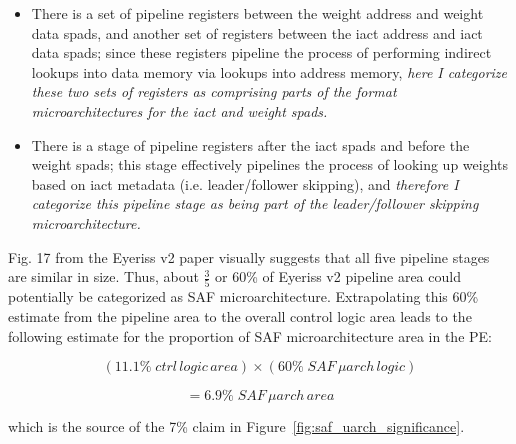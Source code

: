 \begin{itemize}
    \item There is a set of pipeline registers between the weight address and weight data spads, and another set of registers between the iact address and iact data spads; since these registers pipeline the process of performing indirect lookups into data memory via lookups into address memory, \textit{here I categorize these two sets of registers as comprising parts of the format microarchitectures for the iact and weight spads.}
    
    \item There is a stage of pipeline registers after the iact spads and before the weight spads; this stage effectively pipelines the process of looking up weights based on iact metadata (i.e. leader/follower skipping), and \textit{therefore I categorize this pipeline stage as being part of the leader/follower skipping microarchitecture.}
\end{itemize}

Fig. 17 from the Eyeriss v2 paper visually suggests that all five pipeline stages are similar in size. Thus, about $\frac{3}{5}$ or 60\% of Eyeriss v2 pipeline area could potentially be categorized as SAF microarchitecture. Extrapolating this 60\% estimate from the pipeline area to the overall control logic area leads to the following estimate for the proportion of SAF microarchitecture area in the PE:

\[(11.1\%\;ctrl\,logic\,area)\times(60\%\;SAF\,\mu arch\,logic)\]

\[ = 6.9\%\; SAF\,\mu arch\,area\]


which is the source of the 7\% claim in Figure~\ref{fig:saf_uarch_significance}. 
\clearpage
\newpage
